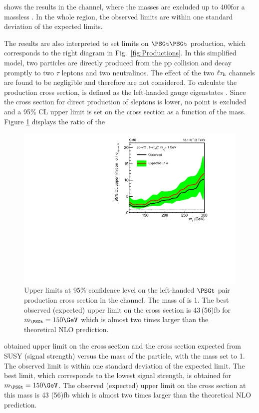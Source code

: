 shows the results in the \tauTau channel, where the \PSGcpmDo masses are excluded up to 400\GeV for a massless \PSGczDo.
In the whole region, the observed limits are within one standard deviation of the expected limits.

The results are also interpreted to set limits on $\PSGt\PSGt$ production,
which corresponds to the right diagram in Fig.~\ref{fig:Productions}.
In this simplified model, two \PSGt particles are directly produced from the pp  collision and decay promptly to two $\tau$ leptons and two neutralinos.
The effect of the two $\ell\tau_\mathrm{h}$ channels are found to be negligible and therefore are not considered.
To calculate the production cross section, \PSGt is defined as the left-handed \PSGt gauge eigenstates \cite{Fuks:2013lya}.
Since the cross section for direct production of sleptons is lower, no point is excluded and a 95\% CL upper limit is set on
the cross section  as a function of the \PSGt mass.
Figure \ref{fig:limit_stau_stau} displays the ratio of the
\begin{linenomath}
\begin{figure}[!htb]
\centering
\includegraphics[width=1.0\textwidth,keepaspectratio=true]{Figure_007.pdf}
\caption{Upper limits at 95\% confidence level on the left-handed $\PSGt$ pair production cross section in the \tauTau channel. The mass of \PSGczDo is 1\GeV.
The best observed (expected) upper limit on the cross section is 43\,(56)\unit{fb} for $m_{\PSGt}=150\GeV$
which is almost two  times larger than the theoretical NLO prediction.}
\label{fig:limit_stau_stau}
\end{figure}
\end{linenomath}
obtained upper limit on the cross section and the cross section expected from SUSY (signal strength) versus the mass of the \PSGt particle,
with the \PSGczDo mass set to 1\GeV.
The observed limit is within one standard deviation of  the expected limit.
The best limit, which corresponds to the lowest signal strength, is obtained for $m_{\PSGt}=150\GeV$.
The observed (expected) upper limit on the cross section at this mass is 43 (56)\unit{fb} which is almost two  times larger than the theoretical NLO prediction.



